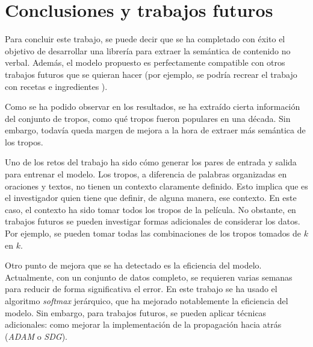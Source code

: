 \chapter{Conclusiones y trabajos futuros}

Para concluir este trabajo, se puede decir que se ha completado con éxito el objetivo de desarrollar una librería
para extraer la semántica de contenido no verbal. Además, el modelo propuesto
es perfectamente compatible con otros trabajos futuros que se quieran hacer (por ejemplo, se podría recrear el trabajo con recetas e ingredientes \cite{kazama2018neural}).

Como se ha podido observar en los resultados, se ha extraído cierta información del conjunto de tropos,
como qué tropos fueron populares en una década. Sin embargo, todavía
queda margen de mejora a la hora de extraer más semántica de los tropos.

Uno de los retos del trabajo ha sido cómo generar los pares de entrada y salida para entrenar el modelo. Los tropos, a diferencia de palabras organizadas en oraciones y textos,
no tienen un contexto claramente definido. Esto implica que es el investigador quien tiene que definir, de alguna manera, ese contexto. En este caso, el contexto ha sido tomar todos los tropos
de la película. No obstante, en trabajos futuros se pueden investigar formas adicionales de considerar los datos. Por ejemplo, se pueden tomar todas las combinaciones de los tropos tomados de $k$ en $k$.


Otro punto de mejora que se ha detectado es la eficiencia del modelo. Actualmente, con un conjunto de datos completo, se requieren varias semanas
para reducir de forma significativa el error. En este trabajo se ha usado el algoritmo \textit{softmax} jerárquico, que ha mejorado notablemente la eficiencia del modelo. Sin embargo,
para trabajos futuros, se pueden aplicar técnicas adicionales: como mejorar la implementación de la propagación hacia atrás (\textit{ADAM} o \textit{SDG}).

